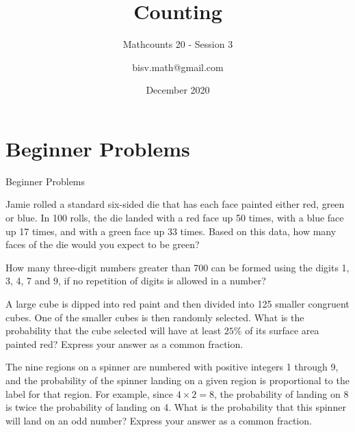 \documentclass[9pt]{beamer}
\title{Counting}
\subtitle{Mathcounts 20 - Session 3}
\author{bisv.math@gmail.com}
\institute{BISV Mathcounts Club 20}
\date{December 2020}
\begin{document}
\titlepage




\section{Beginner Problems}
\begin{frame}
    \begin{alertblock}{}
        \begin{flushright}
        {\huge Beginner Problems}
        \end{flushright}
    \end{alertblock}
\end{frame}
\begin{frame}[t]{5.1}
\begin{block}{}
    Jamie rolled a standard six-sided die that has each face painted either red, green or blue. In 100 rolls, the die landed with a red face up 50 times, with a blue face up 17 times, and with a green face up 33 times. Based on this data, how many faces of the die would you expect to be green?
\end{block}
\end{frame}

\begin{frame}[t]{5.2}
\begin{block}{}
  How many three-digit numbers greater than 700 can be formed using the digits 1, 3, 4, 7 and 9, if no repetition of digits is allowed in a number?
\end{block}
\end{frame}

\begin{frame}[t]{5.3}
\begin{block}{}
 A large cube is dipped into red paint and then divided into 125 smaller congruent cubes. One of the smaller cubes is then randomly selected. What is the probability that the cube selected will have at least $25\%$ of its surface area painted red? Express your answer as a common fraction.
\end{block}
\end{frame}

\begin{frame}[t]{5.4}
\begin{block}{}
    The nine regions on a spinner are numbered with positive integers 1 through 9, and the probability of the spinner landing on a given region is proportional to the label for that region. For example, since $4 \times 2 = 8$, the probability of landing on 8 is twice the probability of landing on 4. What is the probability that this spinner will land on an odd number? Express your answer as a common fraction.
\end{block}
\end{frame}
\end{document}
